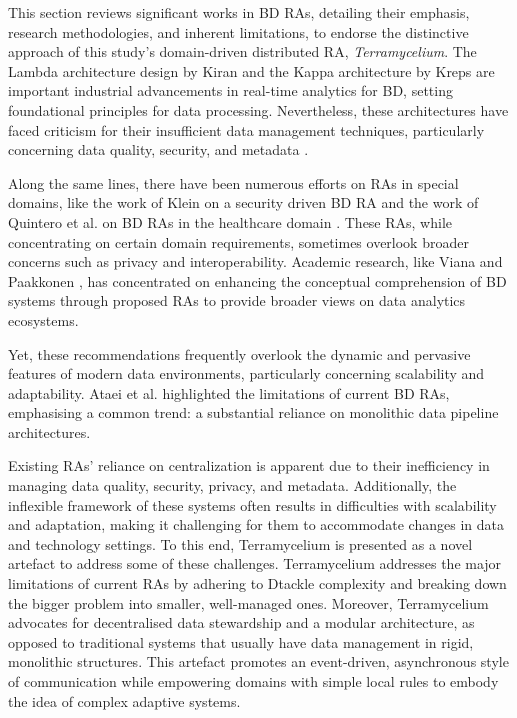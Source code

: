 \documentclass[review]{elsarticle}
\begin{document}
\label{sec:related_work}

This section reviews significant works in BD RAs, detailing their emphasis, research methodologies, and inherent limitations, to endorse the distinctive approach of this study's domain-driven distributed RA, \textit{Terramycelium}. The Lambda architecture design by Kiran \cite{kiran2015lambda} and the Kappa architecture by Kreps \cite{kreps2014} are important industrial advancements in real-time analytics for BD, setting foundational principles for data processing. Nevertheless, these architectures have faced criticism for their insufficient data management techniques, particularly concerning data quality, security, and metadata \cite{AtaeiACIS}. 

Along the same lines, there have been numerous efforts on RAs in special domains, like the work of Klein on a security driven BD RA \cite{klein2016reference} and the work of Quintero et al. on BD RAs in the healthcare domain \cite{quintero2019ibm}. These RAs, while concentrating on certain domain requirements, sometimes overlook broader concerns such as privacy and interoperability. Academic research, like Viana \cite{viana2014proposal} and Paakkonen \cite{paakkonen2015reference}, has concentrated on enhancing the conceptual comprehension of BD systems through proposed RAs to provide broader views on data analytics ecosystems. 

Yet, these recommendations frequently overlook the dynamic and pervasive features of modern data environments, particularly concerning scalability and adaptability. Ataei et al. \cite{ataei2022state} highlighted the limitations of current BD RAs, emphasising a common trend: a substantial reliance on monolithic data pipeline architectures. 

Existing RAs' reliance on centralization is apparent due to their inefficiency in managing data quality, security, privacy, and metadata. Additionally, the inflexible framework of these systems often results in difficulties with scalability and adaptation, making it challenging for them to accommodate changes in data and technology settings. To this end, Terramycelium is presented as a novel artefact to address some of these challenges. Terramycelium addresses the major limitations of current RAs by adhering to Dtackle complexity and breaking down the bigger problem into smaller, well-managed ones. Moreover, Terramycelium advocates for decentralised data stewardship and a modular architecture, as opposed to traditional systems that usually have data management in rigid, monolithic structures. This artefact promotes an event-driven, asynchronous style of communication while empowering domains with simple local rules to embody the idea of complex adaptive systems. 
\end{document}
